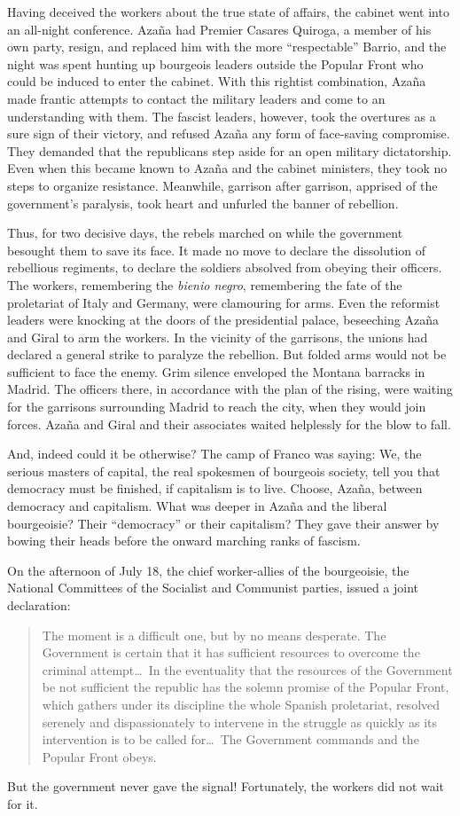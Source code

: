 Having deceived the workers about the true state of affairs, the cabinet went into an all-night conference. Azaña had Premier Casares Quiroga, a member of his own party, resign, and replaced him with the more ``respectable'' Barrio, and the night was spent hunting up bourgeois leaders outside the Popular Front who could be induced to enter the cabinet. With this rightist combination, Azaña made frantic attempts to contact the military leaders and come to an understanding with them. The fascist leaders, however, took the overtures as a sure sign of their victory, and refused Azaña any form of face-saving compromise. They demanded that the republicans step aside for an open military dictatorship. Even when this became known to Azaña and the cabinet ministers, they took no steps to organize resistance. Meanwhile, garrison after garrison, apprised of the government’s paralysis, took heart and unfurled the banner of rebellion.

Thus, for two decisive days, the rebels marched on while the government besought them to save its face. It made no move to declare the dissolution of rebellious regiments, to declare the soldiers absolved from obeying their officers. The workers, remembering the \emph{bienio negro}, remembering the fate of the proletariat of Italy and Germany, were clamouring for arms. Even the reformist leaders were knocking at the doors of the presidential palace, beseeching Azaña and Giral to arm the workers. In the vicinity of the garrisons, the unions had declared a general strike to paralyze the rebellion. But folded arms would not be sufficient to face the enemy. Grim silence enveloped the Montana barracks in Madrid. The officers there, in accordance with the plan of the rising, were waiting for the garrisons surrounding Madrid to reach the city, when they would join forces. Azaña and Giral and their associates waited helplessly for the blow to fall.

And, indeed could it be otherwise? The camp of Franco was saying: We, the serious masters of capital, the real spokesmen of bourgeois society, tell you that democracy must be finished, if capitalism is to live. Choose, Azaña, between democracy and capitalism. What was deeper in Azaña and the liberal bourgeoisie? Their ``democracy'' or their capitalism? They gave their answer by bowing their heads before the onward marching ranks of fascism.

On the afternoon of July 18, the chief worker-allies of the bourgeoisie, the National Committees of the Socialist and Communist parties, issued a joint declaration:
\begin{quote}
  The moment is a difficult one, but by no means desperate. The Government is certain that it has sufficient resources to overcome the criminal attempt\ldots\ In the eventuality that the resources of the Government be not sufficient the republic has the solemn promise of the Popular Front, which gathers under its discipline the whole Spanish proletariat, resolved serenely and dispassionately to intervene in the struggle as quickly as its intervention is to be called for\ldots\ The Government commands and the Popular Front obeys.
\end{quote}
But the government never gave the signal! Fortunately, the workers did not wait for it.